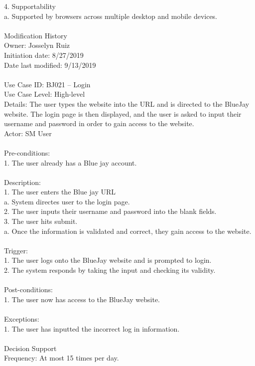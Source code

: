\documentclass{report}
\begin{document}
4.	Supportability\\
a.	Supported by browsers across multiple desktop and mobile devices.\\
\\
Modification History\\
     Owner: Josselyn Ruiz\\
     Initiation date: 8/27/2019\\
     Date last modified: 9/13/2019\\
\\
Use Case ID: BJ021 – Login\\
Use Case Level: High-level\\
Details:  The user types the website into the URL and is directed to the BlueJay website. The login page is then displayed, and the user is asked to input their username and password in order to gain access to the website.\\
Actor: SM User\\
\\
Pre-conditions: \\
1.	The user already has a Blue jay account.\\
\\
Description:\\
1.	The user enters the Blue jay URL\\
a.	System directes user to the login page.\\
2.	The user inputs their username and password into the blank fields.\\
3.	The user hits submit.\\
a.	Once the information is validated and correct, they gain access to the website.\\
\\
Trigger: \\
1.	The user logs onto the BlueJay website and is prompted to login.\\
2.	The system responds by taking the input and checking its validity.\\
\\
Post-conditions:\\
1.	The user now has access to the BlueJay website.\\
\\
Exceptions:\\
1.	The user has inputted the incorrect log in information.\\
\\
Decision Support\\
     Frequency: At most 15 times per day.\\
\end{document}

